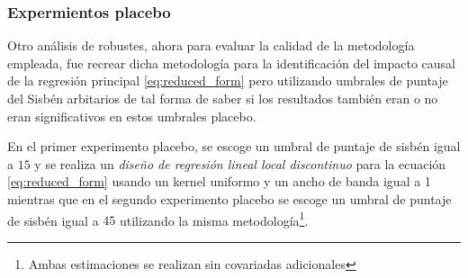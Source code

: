 \documentclass[AER]{AEA}
\begin{document}
\subsubsection{Expermientos placebo}

Otro análisis de robustes, ahora para evaluar la calidad de la metodología empleada, fue recrear dicha metodología para la identificación del impacto causal de la regresión principal \ref{eq:reduced_form} pero utilizando umbrales de puntaje del Sisbén arbitarios de tal forma de saber si los resultados también eran o no eran significativos en estos umbrales placebo. 

En el primer experimento placebo, se escoge un umbral de puntaje de sisbén igual a $15$ y se realiza un \textit{diseño de regresión lineal local discontinuo} para la ecuación \ref{eq:reduced_form} usando un kernel uniformo y un ancho de banda igual a 1 mientras que en el segundo experimento placebo se escoge un umbral de puntaje de sisbén igual a $45$ utilizando la misma metodología\footnote{Ambas estimaciones se realizan sin covariadas adicionales}.
\end{document}
